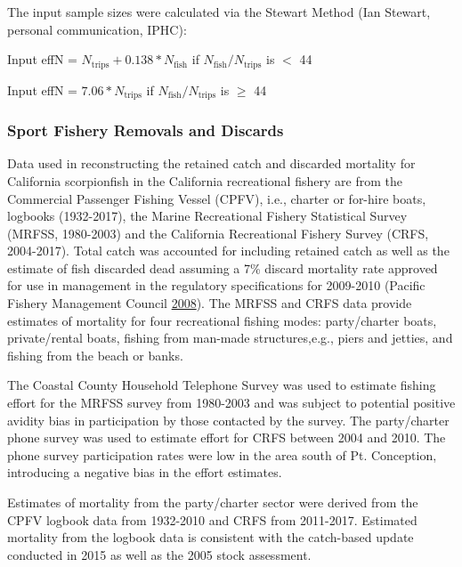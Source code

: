 \documentclass[12pt,]{article}
\begin{document}
The input sample sizes were calculated via the Stewart Method (Ian
Stewart, personal communication, IPHC):

\begin{centering}

Input effN = $N_{\text{trips}} + 0.138 * N_{\text{fish}}$ if $N_{\text{fish}}/N_{\text{trips}}$ is $<$ 44

Input effN = $7.06 * N_{\text{trips}}$ if $N_{\text{fish}}/N_{\text{trips}}$ is $\geq$ 44

\end{centering}

\subsubsection{Sport Fishery Removals and
Discards}\label{sport-fishery-removals-and-discards}

Data used in reconstructing the retained catch and discarded mortality
for California scorpionfish in the California recreational fishery are
from the Commercial Passenger Fishing Vessel (CPFV), i.e., charter or
for-hire boats, logbooks (1932-2017), the Marine Recreational Fishery
Statistical Survey (MRFSS, 1980-2003) and the California Recreational
Fishery Survey (CRFS, 2004-2017). Total catch was accounted for
including retained catch as well as the estimate of fish discarded dead
assuming a 7\% discard mortality rate approved for use in management in
the regulatory specifications for 2009-2010 (Pacific Fishery Management
Council \protect\hyperlink{ref-PFMC2008}{2008}). The MRFSS and CRFS data
provide estimates of mortality for four recreational fishing modes:
party/charter boats, private/rental boats, fishing from man-made
structures,e.g., piers and jetties, and fishing from the beach or banks.

The Coastal County Household Telephone Survey was used to estimate
fishing effort for the MRFSS survey from 1980-2003 and was subject to
potential positive avidity bias in participation by those contacted by
the survey. The party/charter phone survey was used to estimate effort
for CRFS between 2004 and 2010. The phone survey participation rates
were low in the area south of Pt. Conception, introducing a negative
bias in the effort estimates.

Estimates of mortality from the party/charter sector were derived from
the CPFV logbook data from 1932-2010 and CRFS from 2011-2017. Estimated
mortality from the logbook data is consistent with the catch-based
update conducted in 2015 as well as the 2005 stock assessment.
\end{document}
